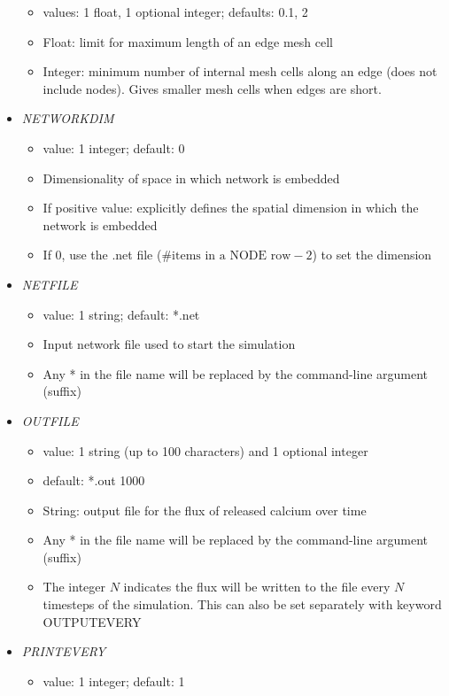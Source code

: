 \documentclass[12pt]{article}
\begin{document}
\begin{itemize}
\begin{itemize}
	\item  values: 1 float, 1 optional integer; defaults: 0.1, 2
	\item Float: limit for maximum length of an edge mesh cell
	\item Integer: minimum number of internal mesh cells along an edge (does not include nodes). Gives smaller mesh cells when edges are short.
\end{itemize}
%
\item {\it NETWORKDIM}
	\begin{itemize}
		\item  value: 1 integer; default: 0
		\item Dimensionality of space in which network is embedded
		\item If positive value: explicitly defines the spatial dimension in which the network is embedded
		\item If 0, use the .net file ($\text{\# items in a NODE row} - 2$) to set the dimension
	\end{itemize}
%
\item {\it NETFILE}
\begin{itemize}
	\item  value: 1 string; default: *.net
	\item Input network file used to start the simulation
	 \item Any * in the file name will be replaced by the command-line argument (suffix)
\end{itemize}
%
\item {\it OUTFILE}
    \begin{itemize}
      \item  value: 1 string (up to 100 characters) and 1 optional integer
      \item  default: *.out 1000
      \item String: output file for the flux of released calcium over time      
      \item Any * in the file name will be replaced by the command-line argument (suffix)
      \item The integer $N$ indicates the flux will be written to the file every $N$ timesteps of the simulation. This can also be set separately with keyword OUTPUTEVERY
      \end{itemize}
%
\item {\it PRINTEVERY}
\begin{itemize}
	\item  value: 1 integer; default: 1

\end{itemize}
\end{itemize}
\end{document}
